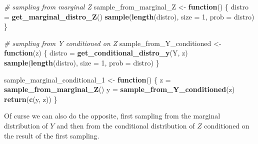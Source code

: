 \documentclass[
]{article}
\newenvironment{Shaded}{\begin{snugshade}}{\end{snugshade}}
\newcommand{\AttributeTok}[1]{\textcolor[rgb]{0.13,0.29,0.53}{#1}}
\newcommand{\CommentTok}[1]{\textcolor[rgb]{0.56,0.35,0.01}{\textit{#1}}}
\newcommand{\ControlFlowTok}[1]{\textcolor[rgb]{0.13,0.29,0.53}{\textbf{#1}}}
\newcommand{\DecValTok}[1]{\textcolor[rgb]{0.00,0.00,0.81}{#1}}
\newcommand{\FunctionTok}[1]{\textcolor[rgb]{0.13,0.29,0.53}{\textbf{#1}}}
\newcommand{\NormalTok}[1]{#1}
\newcommand{\OtherTok}[1]{\textcolor[rgb]{0.56,0.35,0.01}{#1}}
\begin{document}
\begin{Shaded}
\begin{Highlighting}[]
\CommentTok{\# sampling from marginal Z}
\NormalTok{sample\_from\_marginal\_Z }\OtherTok{\textless{}{-}} \ControlFlowTok{function}\NormalTok{() \{}
\NormalTok{    distro }\OtherTok{=} \FunctionTok{get\_marginal\_distro\_Z}\NormalTok{()}
    \FunctionTok{sample}\NormalTok{(}\FunctionTok{length}\NormalTok{(distro), }\AttributeTok{size =} \DecValTok{1}\NormalTok{, }\AttributeTok{prob =}\NormalTok{ distro)}
\NormalTok{\}}

\CommentTok{\# sampling from Y conditioned on Z}
\NormalTok{sample\_from\_Y\_conditioned }\OtherTok{\textless{}{-}} \ControlFlowTok{function}\NormalTok{(z) \{}
\NormalTok{    distro }\OtherTok{=} \FunctionTok{get\_conditional\_distro\_y}\NormalTok{(Y, z)}
    \FunctionTok{sample}\NormalTok{(}\FunctionTok{length}\NormalTok{(distro), }\AttributeTok{size =} \DecValTok{1}\NormalTok{, }\AttributeTok{prob =}\NormalTok{ distro)}
\NormalTok{\}}

\NormalTok{sample\_marginal\_conditional\_1 }\OtherTok{\textless{}{-}} \ControlFlowTok{function}\NormalTok{() \{}
\NormalTok{    z }\OtherTok{=} \FunctionTok{sample\_from\_marginal\_Z}\NormalTok{()}
\NormalTok{    y }\OtherTok{=} \FunctionTok{sample\_from\_Y\_conditioned}\NormalTok{(z)}
    \FunctionTok{return}\NormalTok{(}\FunctionTok{c}\NormalTok{(y, z))}
\NormalTok{\}}
\end{Highlighting}
\end{Shaded}

Of curse we can also do the opposite, first sampling from the marginal
distribution of \(Y\) and then from the conditional distribution of
\(Z\) conditioned on the result of the first sampling.
\end{document}
